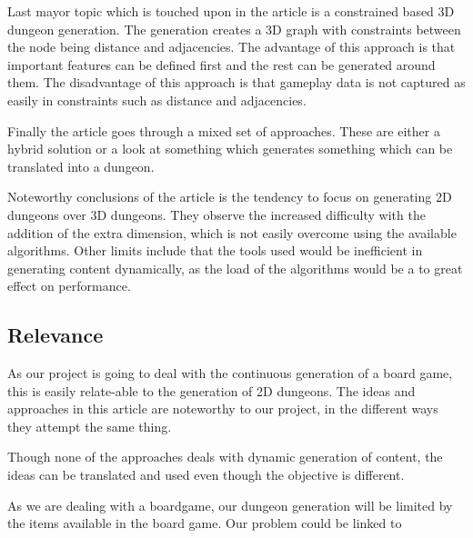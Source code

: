\documentclass[a4paper,11pt]{article}
\begin{document}
Last mayor topic which is touched upon in the article is a constrained based 3D dungeon generation. The generation creates a 3D graph with constraints between the node being distance and adjacencies. The advantage of this approach is that important features can be defined first and the rest can be generated around them. 
The disadvantage of this approach is that gameplay data is not captured as easily in constraints such as distance and adjacencies.

Finally the article goes through a mixed set of approaches. These are either a hybrid solution or a look at something which generates something which can be translated into a dungeon. 

Noteworthy conclusions of the article is the tendency to focus on generating 2D dungeons over 3D dungeons. They observe the increased difficulty with the addition of the extra dimension, which is not easily overcome using the available algorithms. 
Other limits include that the tools used would be inefficient in generating content dynamically, as the load of the algorithms would be a to great effect on performance.

\subsection{Relevance}
As our project is going to deal with the continuous generation of a board game, this is easily relate-able to the generation of 2D dungeons. The ideas and approaches in this article are noteworthy to our project, in the different ways they attempt the same thing. 

Though none of the approaches deals with dynamic generation of content, the ideas can be translated and used even though the objective is different.

As we are dealing with a boardgame, our dungeon generation will be limited by the items available in the board game. Our problem could be linked to 


{}


\pagebreak
\end{document}
